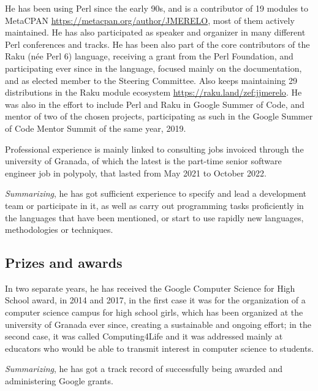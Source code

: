 \documentclass[a4paper,12pt]{article}
\begin{document}
He has been using Perl since the early 90s, and is a contributor of 19 modules
to MetaCPAN \url{https://metacpan.org/author/JMERELO}, most of them actively
maintained. He has also participated as speaker and organizer in many different
Perl conferences and tracks. He has been also part of the core contributors of
the Raku (née Perl 6) language, receiving a grant from the Perl Foundation, and
participating ever since in the language, focused mainly on the documentation,
and as elected member to the Steering Committee. Also keeps maintaining 29
distributions in the Raku module ecosystem
\url{https://raku.land/zef:jjmerelo}. He was also in the effort to include Perl
and Raku in Google Summer of Code, and mentor of two of the chosen projects,
participating as such in the Google Summer of Code Mentor Summit of the same
year, 2019.



Professional experience is mainly linked to consulting jobs invoiced through the
university of Granada, of which the latest is the part-time senior software
engineer job in polypoly, that lasted from May 2021 to October 2022.

{\em Summarizing}, he has got sufficient experience to specify and lead a development
team or participate in it, as well as carry out programming tasks proficiently
in the languages that have been mentioned, or start to use rapidly new
languages, methodologies or techniques.

\subsection{Prizes and awards}

In two separate years, he has received the Google Computer Science for High
School award, in 2014 and 2017, in the first case it was for the organization of
a computer science campus for high school girls, which has been organized at the
university of Granada ever since, creating a sustainable and ongoing effort; in
the second case, it was called Computing4Life and it was addressed mainly at
educators who would be able to transmit interest in computer science to
students.

{\em Summarizing}, he has got a track record of successfully being awarded and
administering Google grants.








\end{document}
